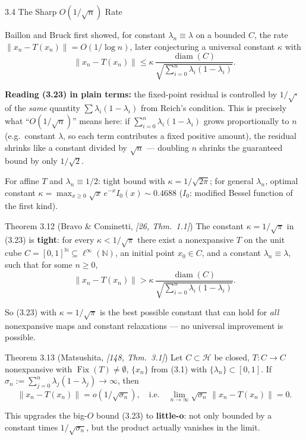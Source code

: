 \documentclass[aspectratio=169,10pt]{beamer}
\newcommand{\cH}{\mathcal{H}}
\newcommand{\Fix}{\operatorname{Fix}}
\newcommand{\N}{\mathbb{N}}
\newcommand{\norm}[1]{\left\|#1\right\|}
\begin{document}
\begin{frame}[allowframebreaks]{3.4 The Sharp $O(1/\sqrt n)$ Rate}

  Baillon and Bruck first showed, for constant $\lambda_n\equiv\lambda$
  on a bounded $C$, the rate $\norm{x_n-T(x_n)}=O(1/\log n)$, later
  conjecturing a universal constant $\kappa$ with
  \begin{equation*}
  \norm{x_n-T(x_n)}\le\kappa\,\frac{\operatorname{diam}(C)}{\sqrt{\sum_{i=0}^n\lambda_i(1-\lambda_i)}}. \tag{3.23}
  \end{equation*}

  \textbf{Reading (3.23) in plain terms:} the fixed-point residual is
  controlled by $1/\sqrt{\cdot}$ of the \emph{same} quantity
  $\sum\lambda_i(1-\lambda_i)$ from Reich's condition. This is precisely
  what ``$O(1/\sqrt n)$'' means here: if $\sum_{i=0}^n\lambda_i(1-\lambda_i)$
  grows proportionally to $n$ (e.g.\ constant $\lambda$, so each term
  contributes a fixed positive amount), the residual shrinks like a
  constant divided by $\sqrt n$ --- doubling $n$ shrinks the guaranteed
  bound by only $1/\sqrt2$.

  For affine $T$ and $\lambda_n\equiv1/2$: tight bound with
  $\kappa=1/\sqrt{2\pi}$; for general $\lambda_n$, optimal constant
  $\kappa=\max_{x\ge0}\sqrt x\,e^{-x}I_0(x)\sim0.4688$ ($I_0$: modified
  Bessel function of the first kind).

  \framebreak

  \begin{block}{Theorem 3.12 (Bravo \& Cominetti, \emph{[26, Thm.\ 1.1]})}
    The constant $\kappa=1/\sqrt\pi$ in (3.23) is \textbf{tight}: for
    every $\kappa<1/\sqrt\pi$ there exist a nonexpansive $T$ on the unit
    cube $C=[0,1]^{\N}\subseteq\ell^\infty(\N)$, an initial point
    $x_0\in C$, and a constant $\lambda_n\equiv\lambda$, such that for
    some $n\ge0$,
    $$\norm{x_n-T(x_n)}>\kappa\,\frac{\operatorname{diam}(C)}{\sqrt{\sum_{i=0}^n\lambda_i(1-\lambda_i)}}.$$
  \end{block}
  So (3.23) with $\kappa=1/\sqrt\pi$ is the best possible constant that
  can hold for \emph{all} nonexpansive maps and constant relaxations ---
  no universal improvement is possible.

  \begin{block}{Theorem 3.13 (Matsushita, \emph{[148, Thm.\ 3.1]})}
    Let $C\subset\cH$ be closed, $T:C\to C$ nonexpansive with
    $\Fix(T)\ne\emptyset$, $\{x_n\}$ from (3.1) with $\{\lambda_n\}
    \subset[0,1]$. If $\sigma_n:=\sum_{j=0}^n\lambda_j(1-\lambda_j)\to\infty$,
    then $$\norm{x_n-T(x_n)}=o(1/\sqrt{\sigma_n}),\quad\text{i.e.}\quad
    \lim_{n\to\infty}\sqrt{\sigma_n}\,\norm{x_n-T(x_n)}=0.$$
  \end{block}
  This upgrades the big-$O$ bound (3.23) to \textbf{little-o}: not only
  bounded by a constant times $1/\sqrt{\sigma_n}$, but the product
  actually vanishes in the limit.
\end{frame}
\end{document}
